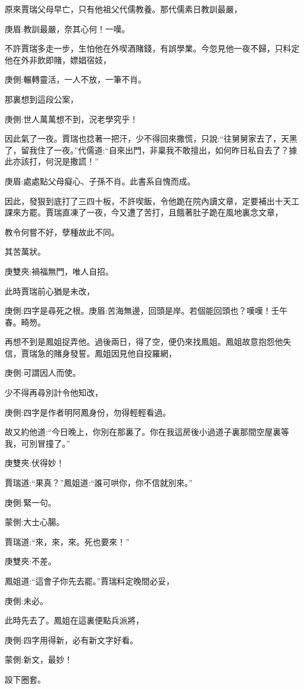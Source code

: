 \begin{parag}
    原來賈瑞父母早亡，只有他祖父代儒教養。那代儒素日教訓最嚴，\begin{note}庚眉:教訓最嚴，奈其心何！一嘆。\end{note}不許賈瑞多走一步，生怕他在外喫酒賭錢，有誤學業。今忽見他一夜不歸，只料定他在外非飲即賭，嫖娼宿妓，\begin{note}庚側:輾轉靈活，一人不放，一筆不肖。\end{note}那裏想到這段公案，\begin{note}庚側:世人萬萬想不到，況老學究乎！\end{note}因此氣了一夜。賈瑞也捻著一把汗，少不得回來撒慌，只說:“往舅舅家去了，天黑了，留我住了一夜。”代儒道:“自來出門，非稟我不敢擅出，如何昨日私自去了？據此亦該打，何況是撒謊！”\begin{note}庚眉:處處點父母癡心、子孫不肖。此書系自愧而成。\end{note}因此，發狠到底打了三四十板，不許喫飯，令他跪在院內讀文章，定要補出十天工課來方罷。賈瑞直凍了一夜，今又遭了苦打，且餓著肚子跪在風地裏念文章，\begin{note}教令何嘗不好，孽種故此不同。\end{note}其苦萬狀。\begin{note}庚雙夾:禍福無門，唯人自招。\end{note}
\end{parag}


\begin{parag}
    此時賈瑞前心猶是未改，\begin{note}庚側:四字是尋死之根。庚眉:苦海無邊，回頭是岸。若個能回頭也？嘆嘆！壬午春。畸笏。\end{note}再想不到是鳳姐捉弄他。過後兩日，得了空，便仍來找鳳姐。鳳姐故意抱怨他失信，賈瑞急的賭身發誓。鳳姐因見他自投羅網，\begin{note}庚側:可謂因人而使。\end{note}少不得再尋別計令他知改，\begin{note}庚側:四字是作者明阿鳳身份，勿得輕輕看過。\end{note}故又約他道:“今日晚上，你別在那裏了。你在我這房後小過道子裏那間空屋裏等我，可別冒撞了。”\begin{note}庚雙夾:伏得妙！\end{note}賈瑞道:“果真？”鳳姐道:“誰可哄你，你不信就別來。”\begin{note}庚側:緊一句。\end{note}\begin{note}蒙側:大士心腸。\end{note}賈瑞道:“來，來，來。死也要來！”\begin{note}庚雙夾:不差。\end{note}鳳姐道:“這會子你先去罷。”賈瑞料定晚間必妥，\begin{note}庚側:未必。\end{note}此時先去了。鳳姐在這裏便點兵派將，\begin{note}庚側:四字用得新，必有新文字好看。\end{note}\begin{note}蒙側:新文，最妙！\end{note}設下圈套。
\end{parag}


